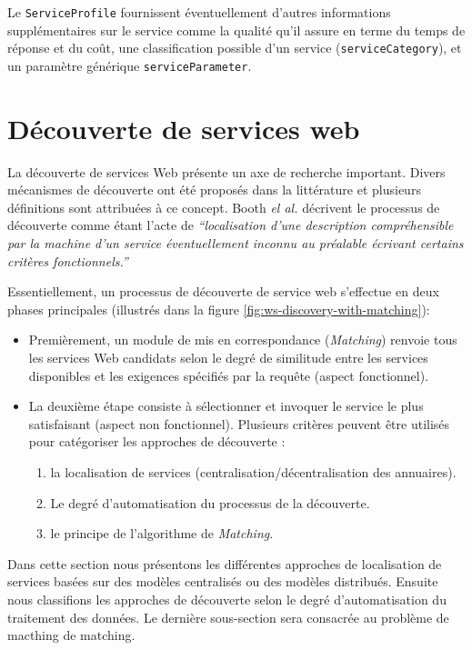     Le \verb|ServiceProfile| fournissent éventuellement d'autres
    informations supplémentaires sur le service comme la qualité qu'il
    assure en terme du temps de réponse et du coût, une classification
    possible d'un service (\verb|serviceCategory|), et un paramètre
    générique \verb|serviceParameter|.

\section{Découverte de services web}
\label{sec:ws-discovery}
La découverte de services Web présente un axe de recherche
important. Divers mécanismes de découverte ont été proposés dans la
littérature et plusieurs définitions sont attribuées à ce
concept. Booth \textit{el al.} \cite{booth2004web} décrivent le
processus de découverte comme étant l'acte de \textit{``localisation
  d'une description compréhensible par la machine d'un service
  éventuellement inconnu au préalable écrivant certains critères
  fonctionnels.''}



Essentiellement, un processus de découverte de service web s'effectue
en deux phases principales (illustrés dans la figure
\ref{fig:ws-discovery-with-matching}):

\SpecialItem
\begin{itemize}
\item Premièrement, un module de mis en correspondance
  (\textit{Matching}) renvoie tous les services Web candidats selon le
  degré de similitude entre les services disponibles et les exigences
  spécifiés par la requête (aspect fonctionnel).

\item La deuxième étape consiste à sélectionner et invoquer le service
  le plus satisfaisant (aspect non fonctionnel). Plusieurs critères
  peuvent être utilisés pour catégoriser les approches de découverte
  \cite{elie2010}:
\enddescription
  \begin{enumerate}
  \item la localisation de services (centralisation/décentralisation
    des annuaires).
  \item Le degré d'automatisation du processus de la découverte.
  \item le principe de l'algorithme de \textit{Matching}.
\end{enumerate}
\end{itemize}

Dans cette section nous présentons les différentes approches de
localisation de services basées sur des modèles centralisés ou des
modèles distribués. Ensuite nous classifions les approches de
découverte selon le degré d'automatisation du traitement des
données. Le dernière sous-section sera consacrée au problème de
macthing de matching.

